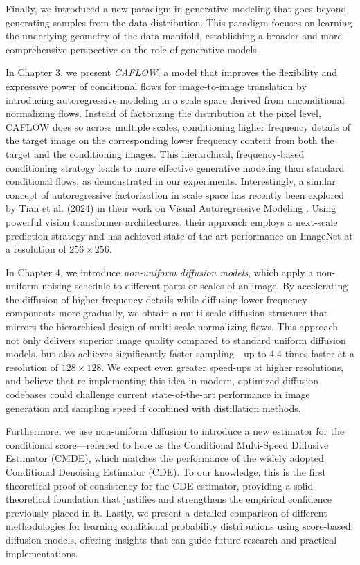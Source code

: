 Finally, we introduced a new paradigm in generative modeling that goes beyond generating samples from the data distribution. This paradigm focuses on learning the underlying geometry of the data manifold, establishing a broader and more comprehensive perspective on the role of generative models.

In Chapter 3, we present \emph{CAFLOW}, a model that improves the flexibility and expressive power of conditional flows for image-to-image translation by introducing autoregressive modeling in a scale space derived from unconditional normalizing flows. Instead of factorizing the distribution at the pixel level, CAFLOW does so across multiple scales, conditioning higher frequency details of the target image on the corresponding lower frequency content from both the target and the conditioning images. This hierarchical, frequency-based conditioning strategy leads to more effective generative modeling than standard conditional flows, as demonstrated in our experiments. Interestingly, a similar concept of autoregressive factorization in scale space has recently been explored by Tian et al. (2024) in their work on Visual Autoregressive Modeling \cite{tian2024visual}. Using powerful vision transformer architectures, their approach employs a next-scale prediction strategy and has achieved state-of-the-art performance on ImageNet at a resolution of $256\times256$.

In Chapter 4, we introduce \emph{non-uniform diffusion models}, which apply a non-uniform noising schedule to different parts or scales of an image. By accelerating the diffusion of higher-frequency details while diffusing lower-frequency components more gradually, we obtain a multi-scale diffusion structure that mirrors the hierarchical design of multi-scale normalizing flows. This approach not only delivers superior image quality compared to standard uniform diffusion models, but also achieves significantly faster sampling—up to 4.4 times faster at a resolution of $128\times128$. We expect even greater speed-ups at higher resolutions, and believe that re-implementing this idea in modern, optimized diffusion codebases could challenge current state-of-the-art performance in image generation and sampling speed if combined with distillation methods.

Furthermore, we use non-uniform diffusion to introduce a new estimator for the conditional score—referred to here as the Conditional Multi-Speed Diffusive Estimator (CMDE), which matches the performance of the widely adopted Conditional Denoising Estimator (CDE). To our knowledge, this is the first theoretical proof of consistency for the CDE estimator, providing a solid theoretical foundation that justifies and strengthens the empirical confidence previously placed in it. Lastly, we present a detailed comparison of different methodologies for learning conditional probability distributions using score-based diffusion models, offering insights that can guide future research and practical implementations.

